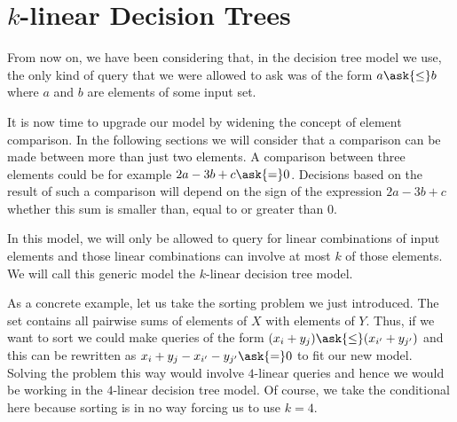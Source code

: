 \section{\(k\)-linear Decision Trees}

From now on, we have been considering that, in the decision tree
model we use, the only kind of query that we were allowed to ask was of the
form \(a \ask{\le} b \) where \(a\) and \(b\) are elements of some input set.

It is now time to upgrade our model by widening the concept of element
comparison. In the following sections we will consider that a comparison can
be made between more than just two elements. A comparison between three
elements could be for example \(2a - 3b + c \ask{=} 0\). Decisions based on the
result of such a comparison will depend on the sign of the expression
\(2a - 3b + c\) \ie whether this sum is smaller than, equal to or greater than
\(0\).

In this model, we will only be allowed to query for linear combinations of
input elements and those linear combinations can involve at most \(k\) of those
elements. We will call this generic model the \(k\)-linear decision tree model.

As a concrete example, let us take the sorting \XY problem we just introduced.
The set \XY contains all pairwise sums of elements of \(X\) with elements of
\(Y\). Thus, if we want to sort \XY we could make queries of the form \((x_i +
y_j) \ask{\le} (x_{i'} + y_{j'})\) and this can be rewritten as \( x_i +
y_j - x_{i'} - y_{j'} \ask{=} 0\) to fit our new model. Solving the problem
this way would involve \(4\)-linear queries and hence we would be working in
the \(4\)-linear decision tree model. Of course, we take the conditional here
because sorting \XY is in no way forcing us to use \(k=4\).

